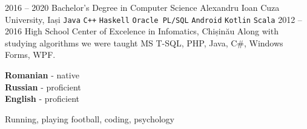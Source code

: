 \documentclass[9pt]{developercv} %
\begin{document}


\begin{entrylist}
	\entry
		{2016 -- 2020}
		{Bachelor's Degree in Computer Science}
		{Alexandru Ioan Cuza University, Iași}
		{\texttt{Java}\slashsep
		 \texttt{C++}\slashsep
		 \texttt{Haskell}\slashsep
		 \texttt{Oracle PL/SQL}\slashsep
		 \texttt{Android}\slashsep
		 \texttt{Kotlin}\slashsep
		 \texttt{Scala}
		}
	\entry
		{2012 -- 2016}
		{High School}
		{Center of Excelence in Infomatics, Chișinău}
		{Along with studying algorithms we were taught MS T-SQL, PHP, Java, C\#, Windows Forms, WPF.}
\end{entrylist}


\begin{minipage}[t]{0.3\textwidth}
	\vspace{-\baselineskip} %

	
	\textbf{Romanian} - native\\
	\textbf{Russian} - proficient\\
	\textbf{English} - proficient
\end{minipage}
\hfill
\begin{minipage}[t]{0.3\textwidth}
	\vspace{-\baselineskip} %
	
	
	Running, playing football, coding, psychology
\end{minipage}

\end{document}
